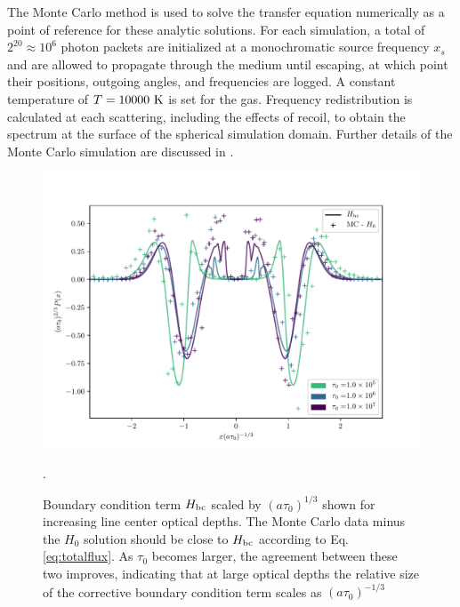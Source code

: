 \documentclass{aastex63}
\begin{document}
The Monte Carlo method is used to solve the transfer equation numerically as a point of reference for these analytic solutions. For each simulation, a total of $2^{20} \approx 10^6$ photon packets are initialized at a monochromatic source frequency $x_s$ and are allowed to propagate through the medium until escaping, at which point their positions, outgoing angles, and frequencies are logged. A constant temperature of $T=10000\ \rm K$ is set for the gas. Frequency redistribution is calculated at each scattering, including the effects of recoil, to obtain the spectrum at the surface of the spherical simulation domain. Further details of the Monte Carlo simulation are discussed in \cite{2017ApJ...851..150H}.

\ifx
\begin{figure}
    \centering
    \includegraphics{taubc.pdf}
    \caption{Boundary condition term $H_{\rm bc}$ scaled by $(a\tau_0)^{1/3}$ shown for increasing line center optical depths. The Monte Carlo data minus the $H_0$ solution should be close to $H_{\rm bc}$ according to Eq. \ref{eq:totalflux}. As $\tau_0$ becomes larger, the agreement between these two improves, indicating that at large optical depths the relative size of the corrective boundary condition term scales as $(a\tau_0)^{-1/3}$}.
    \label{fig:taubc}
\end{figure}
\fi
\end{document}
